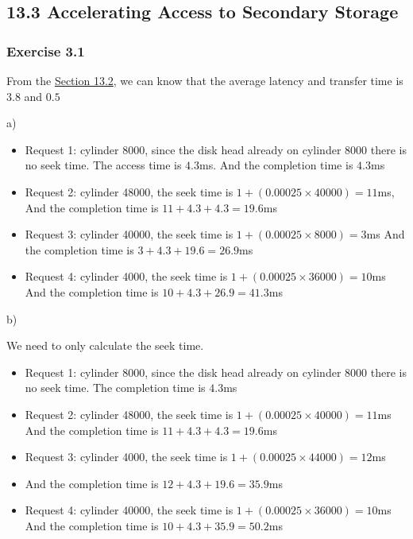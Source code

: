 \documentclass[../../main.tex]{subfiles}
\begin{document}
\subsection{13.3 Accelerating Access to Secondary Storage}

\subsubsection*{Exercise 3.1}

From the \hyperlink{Section13.2}{Section 13.2}, we can know that the average latency
and transfer time is $3.8$ and $0.5$

a)

\begin{itemize}
  \item Request 1: cylinder 8000, since the disk head already on cylinder 8000 there
        is no seek time. The access time is $4.3$ms. And the completion time is $4.3$ms
  \item Request 2: cylinder 48000, the seek time is $ 1 + (0.00025 \times 40000) = 11$ms,
        And the completion time is $11 + 4.3 + 4.3 = 19.6$ms
  \item Request 3: cylinder 40000, the seek time is $ 1 + (0.00025 \times 8000) = 3$ms
        And the completion time is $3 + 4.3 + 19.6 = 26.9$ms
  \item Request 4: cylinder 4000, the seek time is $1 + (0.00025 \times 36000) = 10$ms
        And the completion time is $10 + 4.3 + 26.9 = 41.3$ms
\end{itemize}

b)

We need to only calculate the seek time.

\begin{itemize}
  \item Request 1: cylinder 8000, since the disk head already on cylinder 8000 there
        is no seek time. The completion time is $4.3$ms
  \item Request 2: cylinder 48000, the seek time is $ 1 + (0.00025 \times 40000) = 11$ms
        And the completion time is $11 + 4.3 + 4.3 = 19.6$ms
  \item Request 3: cylinder 4000, the seek time is $ 1 + (0.00025 \times 44000) = 12$ms
  \item And the completion time is $12 + 4.3 + 19.6 = 35.9$ms
  \item Request 4: cylinder 40000, the seek time is $1 + (0.00025 \times 36000) = 10$ms
        And the completion time is $10 + 4.3 + 35.9 = 50.2$ms
\end{itemize}
\end{document}
